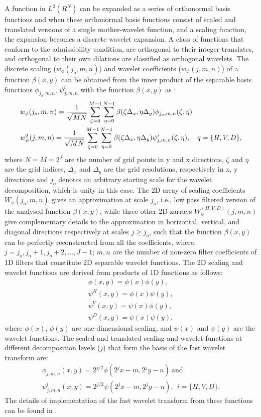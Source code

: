 A function in $L^{2}(R^{N})$ can be expanded as a series of orthonormal basis functions and when these orthonormal basis functions consist of scaled and translated versions of a single mother-wavelet function, and a scaling function, the expansion becomes a discrete wavelet expansion. A class of functions that conform to the admissibility condition, are orthogonal to their integer translates, and orthogonal to their own dilations \citep{daubechies88, book_burrus_gopi} are classified as orthogonal wavelets. The discrete scaling ($w_{\phi}(j_o,m,n)$) and wavelet coefficients ($w_{\psi}(j,m,n)$) of a function $\beta(x,y)$ can be obtained from the inner product of the separable basis functions $\phi_{j_o,m,n}$, $\psi_{j,m,n}^{i}$ with the function $\beta(x,y)$ as \citep{dim_gonzalez,book_burrus_gopi,rice_wavelet_toolbox}: 
\begin{align}
& w_{\phi}(j_o,m,n) = \frac{1}{\sqrt{MN}}\sum_{\zeta=0}^{M-1}\sum_{\eta=0}^{N-1}\beta(\zeta\Delta_x,\eta\Delta_y)\phi_{j_o,m,n}(\zeta,\eta) \notag \\ 
& w_{\psi}^q(j,m,n) = \frac{1}{\sqrt{MN}}\sum_{\zeta=0}^{M-1}\sum_{\eta=0}^{N-1}\beta(\zeta\Delta_x,\eta\Delta_y)\psi_{j,m,n}^{i}(\zeta,\eta), \ \ \ q=\{ H,V,D \},
\end{align}
\noindent where $N=M=2^{J}$ are the number of grid points in y and x directions, $\zeta$ and $\eta$ are the grid indices, $\Delta_x$ and $\Delta_y$ are the grid resolutions, respectively in x, y directions and $j_o$ denotes an arbitrary starting scale for the wavelet decomposition, which is unity in this case. The 2D array of scaling coefficients $W_{\phi}(j_o,m,n)$ gives an approximation at scale $j_o$, i.e., low pass filtered version of the analysed function $\beta(x,y)$, while three other 2D zarrays $W_{\psi}^{(H,V,D)}(j,m,n)$ give complementary details to the approximation in horizontal, vertical, and diagonal directions respectively at scales $j \geq j_o$, such that the function $\beta(x,y)$ can be perfectly reconstructed from all the coefficients, where, $j=j_o,j_o+1,j_o+2,...,J-1$; $m,n$ are the number of non-zero filter coefficients of 1D filters that constitute 2D separable wavelet functions. The 2D scaling and wavelet functions are derived from products of 1D functions as follows:
\begin{align}
  \phi(x,y) = \phi(x)\phi(y), \\
  \psi^{H}(x,y)=\phi(x)\psi(y), \\
  \psi^{V}(x,y)=\psi(x)\phi(y), \\
  \psi^{D}(x,y)=\psi(x)\psi(y),
\end{align}
where $\phi(x)$, $\phi(y)$ are one-dimensional scaling, and $\psi(x)$ and $\psi(y)$ are the wavelet functions. The scaled and translated  scaling and wavelet functions at different decomposition levels ($j$) that form the basis of the fast wavelet transform are:
\begin{align}
  \phi_{j,m,n}(x,y)=2^{j/2}\phi(2^{j}x-m, 2^{j}y-n)\ \text{and} \\
  \psi^{i}_{j,m,n}(x,y)=2^{j/2}\psi(2^{j}x-m, 2^{j}y-n), \ \ i=\{H, V, D\}.
\end{align}
The details of implementation of the fast wavelet transform from these functions can be found in \citep{dim_gonzalez,book_burrus_gopi}.

